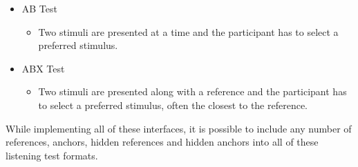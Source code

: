 \documentclass{sig-alternate}
\begin{document}
\begin{itemize}[noitemsep,nolistsep]
\begin{itemize}
		\end{itemize}
		\item AB Test~\cite{lipshitz1981great}
		\begin{itemize}
			\item Two stimuli are presented at a time and the participant has to select a preferred stimulus.
		\end{itemize}
		\item ABX Test~\cite{clark1982high}
		\begin{itemize}
			\item Two stimuli are presented along with a reference and the participant has to select a preferred stimulus, often the closest to the reference.
		\end{itemize}
	\end{itemize}
	
	While implementing all of these interfaces, it is possible to include any number of references, anchors, hidden references and hidden anchors into all of these listening test formats.
	
\end{document}
